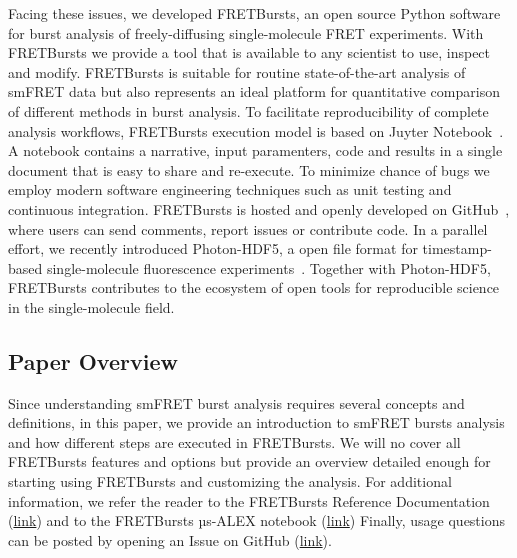 
Facing these issues, we developed FRETBursts, 
an open source Python software for burst analysis of freely-diffusing
single-molecule FRET experiments. 
With FRETBursts we provide a tool that is available to any scientist
to use, inspect and modify. FRETBursts is suitable for routine state-of-the-art 
analysis of smFRET data but also represents an ideal platform 
for quantitative comparison of different methods in burst analysis.
To facilitate reproducibility of complete analysis
workflows, FRETBursts execution model is based on Juyter Notebook~\cite{Shen_2014}.
A notebook contains a narrative, input paramenters, code and 
results in a single document that is easy to share and re-execute.
To minimize chance of bugs we employ modern software engineering techniques
such as unit testing and continuous integration.
FRETBursts is hosted and openly developed on GitHub~\cite{Blischak_2016,Prli__2012}, 
where users can send comments, report issues or contribute code.
In a parallel effort, we recently introduced Photon-HDF5,
a open file format for timestamp-based single-molecule fluorescence 
experiments~\cite{Ingargiola2016}. Together with Photon-HDF5,
FRETBursts contributes to the ecosystem
of open tools for reproducible science in the single-molecule field.


\subsection{Paper Overview}
Since understanding smFRET burst analysis requires several concepts and definitions,
in this paper, we provide an introduction to smFRET bursts analysis and 
how different steps are executed in FRETBursts. 
We will no cover all FRETBursts
features and options but provide an overview detailed enough for starting
using FRETBursts and customizing the analysis. For additional information, 
we refer the reader to the FRETBursts Reference Documentation
(\href{http://fretbursts.readthedocs.org/}{link}) and to
the FRETBursts µs-ALEX notebook
(\href{http://nbviewer.jupyter.org/github/tritemio/FRETBursts_notebooks/blob/master/notebooks/FRETBursts%20-%20us-ALEX%20smFRET%20burst%20analysis.ipynb}{link})
Finally, usage questions can be posted by  opening an Issue
on GitHub (\href{https://github.com/tritemio/FRETBursts}{link}).

